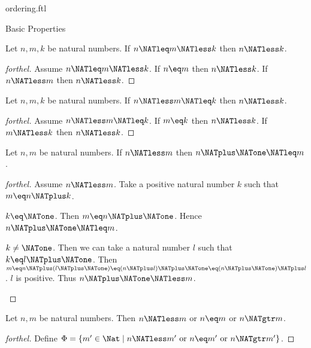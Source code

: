 \documentclass{naproche-library}
\begin{document}
\begin{smodule}[title=The Standard Ordering of the Natural Numbers]{ordering.ftl}
\begin{sfragment}{Basic Properties}
  \begin{proposition}[forthel,id=ARITHMETIC_04_5098403656630272]
    Let $n, m, k$ be natural numbers.
    If $n \NATleq m \NATless k$ then $n \NATless k$.
  \end{proposition}
  \begin{proof}[forthel]
    Assume $n \NATleq m \NATless k$.
    If $n \eq m$ then $n \NATless k$.
    If $n \NATless m$ then $n \NATless k$.
  \end{proof}

  \begin{proposition}[forthel,id=ARITHMETIC_04_4809599527944192]
    Let $n, m, k$ be natural numbers.
    If $n \NATless m \NATleq k$ then $n \NATless k$.
  \end{proposition}
  \begin{proof}[forthel]
    Assume $n \NATless m \NATleq k$.
    If $m \eq k$ then $n \NATless k$.
    If $m \NATless k$ then $n \NATless k$.
  \end{proof}

  \begin{proposition}[forthel,id=ARITHMETIC_04_8584998051381248]
    Let $n, m$ be natural numbers.
    If $n \NATless m$ then $n \NATplus \NATone \NATleq m$.
  \end{proposition}
  \begin{proof}[forthel]
    Assume $n \NATless m$.
    Take a positive natural number $k$ such that $m \eq n \NATplus k$.

    \begin{case}{$k \eq \NATone$.}
      Then $m \eq n \NATplus \NATone$.
      Hence $n \NATplus \NATone \NATleq m$.
    \end{case}

    \begin{case}{$k \neq \NATone$.}
      Then we can take a natural number $l$ such that $k \eq l \NATplus \NATone$.
      Then $m
        \eq n \NATplus (l \NATplus \NATone)
        \eq (n \NATplus l) \NATplus \NATone
        \eq (n \NATplus \NATone) \NATplus l$.
      $l$ is positive.
      Thus $n \NATplus \NATone \NATless m$.
    \end{case}
  \end{proof}

  \begin{proposition}[forthel,id=ARITHMETIC_04_8201937860165632]
    Let $n, m$ be natural numbers.
    Then $n \NATless m$ or $n \eq m$ or $n \NATgtr m$.
  \end{proposition}
  \begin{proof}[forthel]
    Define $\Phi = \{ m' \in \Nat \mid n \NATless m'\text{ or }n \eq m'\text{ or }n \NATgtr m' \}$.


\end{proof}
\end{sfragment}
\end{smodule}
\end{document}
